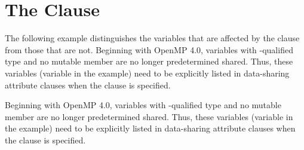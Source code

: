 \pagebreak
\chapter{The  Clause}
\label{chap:default_none}

The following example distinguishes the variables that are affected by the  
clause from those that are not. 
Beginning with OpenMP 4.0, variables with -qualified type and no mutable member 
are no longer predetermined shared.  Thus, these variables (variable  in the example) 
need to be explicitly listed
in data-sharing attribute clauses when the  clause is specified.

\ccppspecificstart
Beginning with OpenMP 4.0, variables with -qualified type and no mutable member 
are no longer predetermined shared.  Thus, these variables (variable  in the example) 
need to be explicitly listed
in data-sharing attribute clauses when the  clause is specified.

\ccppspecificend



